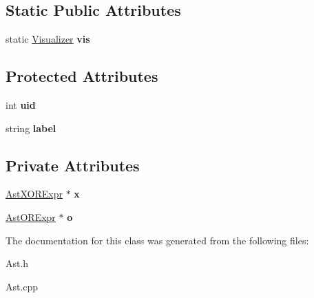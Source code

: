 \subsection*{Static Public Attributes}
\begin{DoxyCompactItemize}
\item 
\hypertarget{classAST_aca9e6637209b31e03a09c0d42f29bdfa}{static \hyperlink{classVisualizer}{Visualizer} {\bfseries vis}}\label{classAST_aca9e6637209b31e03a09c0d42f29bdfa}

\end{DoxyCompactItemize}
\subsection*{Protected Attributes}
\begin{DoxyCompactItemize}
\item 
\hypertarget{classAST_a847b778f1c3dd5a19de32de432ee6e15}{int {\bfseries uid}}\label{classAST_a847b778f1c3dd5a19de32de432ee6e15}

\item 
\hypertarget{classAST_ab2e239ccc0688d2341724432ff5a1a31}{string {\bfseries label}}\label{classAST_ab2e239ccc0688d2341724432ff5a1a31}

\end{DoxyCompactItemize}
\subsection*{Private Attributes}
\begin{DoxyCompactItemize}
\item 
\hypertarget{classAstORExpr_a48febfda9238b0c72ba8193a6cdb3b91}{\hyperlink{classAstXORExpr}{Ast\-X\-O\-R\-Expr} $\ast$ {\bfseries x}}\label{classAstORExpr_a48febfda9238b0c72ba8193a6cdb3b91}

\item 
\hypertarget{classAstORExpr_a1ba5315c8b880fe7c658cb458cd9c54c}{\hyperlink{classAstORExpr}{Ast\-O\-R\-Expr} $\ast$ {\bfseries o}}\label{classAstORExpr_a1ba5315c8b880fe7c658cb458cd9c54c}

\end{DoxyCompactItemize}


The documentation for this class was generated from the following files\-:\begin{DoxyCompactItemize}
\item 
Ast.\-h\item 
Ast.\-cpp\end{DoxyCompactItemize}
